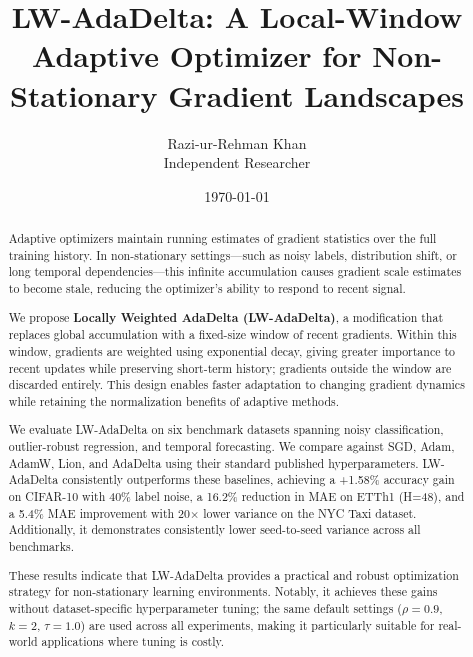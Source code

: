 \documentclass[11pt,a4paper]{article}
\begin{document}
\title{LW-AdaDelta: A Local-Window Adaptive Optimizer for Non-Stationary Gradient Landscapes}
\author{Razi-ur-Rehman Khan\\
\small{Independent Researcher}}
\date{\today}

\maketitle

\begin{abstract}
Adaptive optimizers maintain running estimates of gradient statistics over the full training history. In non-stationary settings---such as noisy labels, distribution shift, or long temporal dependencies---this infinite accumulation causes gradient scale estimates to become stale, reducing the optimizer's ability to respond to recent signal.

We propose \textbf{Locally Weighted AdaDelta (LW-AdaDelta)}, a modification that replaces global accumulation with a fixed-size window of recent gradients. Within this window, gradients are weighted using exponential decay, giving greater importance to recent updates while preserving short-term history; gradients outside the window are discarded entirely. This design enables faster adaptation to changing gradient dynamics while retaining the normalization benefits of adaptive methods.

We evaluate LW-AdaDelta on six benchmark datasets spanning noisy classification, outlier-robust regression, and temporal forecasting. We compare against SGD, Adam, AdamW, Lion, and AdaDelta using their standard published hyperparameters. LW-AdaDelta consistently outperforms these baselines, achieving a +1.58\% accuracy gain on CIFAR-10 with 40\% label noise, a 16.2\% reduction in MAE on ETTh1 (H=48), and a 5.4\% MAE improvement with 20$\times$ lower variance on the NYC Taxi dataset. Additionally, it demonstrates consistently lower seed-to-seed variance across all benchmarks.

These results indicate that LW-AdaDelta provides a practical and robust optimization strategy for non-stationary learning environments. Notably, it achieves these gains without dataset-specific hyperparameter tuning; the same default settings ($\rho = 0.9$, $k = 2$, $\tau = 1.0$) are used across all experiments, making it particularly suitable for real-world applications where tuning is costly.
\end{abstract}
\end{document}

